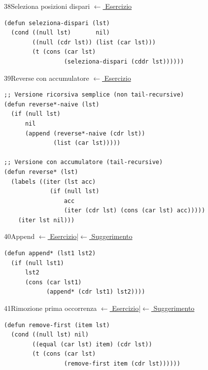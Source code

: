 \label{sol:38}
\begin{solbox}{38}{Seleziona posizioni dispari}
\small\color{black!55}\hyperref[ex:38]{$\leftarrow$ Esercizio}\normalsize\color{black}
\begin{lstlisting}
(defun seleziona-dispari (lst)
  (cond ((null lst)       nil)
        ((null (cdr lst)) (list (car lst)))
        (t (cons (car lst)
                 (seleziona-dispari (cddr lst))))))
\end{lstlisting}
\end{solbox}

\label{sol:39}
\begin{solbox}{39}{Reverse con accumulatore}
\small\color{black!55}\hyperref[ex:39]{$\leftarrow$ Esercizio}\normalsize\color{black}
\begin{lstlisting}
;; Versione ricorsiva semplice (non tail-recursive)
(defun reverse*-naive (lst)
  (if (null lst)
      nil
      (append (reverse*-naive (cdr lst))
              (list (car lst)))))

;; Versione con accumulatore (tail-recursive)
(defun reverse* (lst)
  (labels ((iter (lst acc)
             (if (null lst)
                 acc
                 (iter (cdr lst) (cons (car lst) acc)))))
    (iter lst nil)))
\end{lstlisting}
\end{solbox}

\label{sol:40}
\begin{solbox}{40}{Append}
\small\color{black!55}\hyperref[ex:40]{$\leftarrow$ Esercizio}\enspace\textcolor{black!30}{|}\enspace\hyperref[hint:40]{$\leftarrow$ Suggerimento}\normalsize\color{black}
\begin{lstlisting}
(defun append* (lst1 lst2)
  (if (null lst1)
      lst2
      (cons (car lst1)
            (append* (cdr lst1) lst2))))
\end{lstlisting}
\end{solbox}

\label{sol:41}
\begin{solbox}{41}{Rimozione prima occorrenza}
\small\color{black!55}\hyperref[ex:41]{$\leftarrow$ Esercizio}\enspace\textcolor{black!30}{|}\enspace\hyperref[hint:41]{$\leftarrow$ Suggerimento}\normalsize\color{black}
\begin{lstlisting}
(defun remove-first (item lst)
  (cond ((null lst) nil)
        ((equal (car lst) item) (cdr lst))
        (t (cons (car lst)
                 (remove-first item (cdr lst))))))
\end{lstlisting}
\end{solbox}

